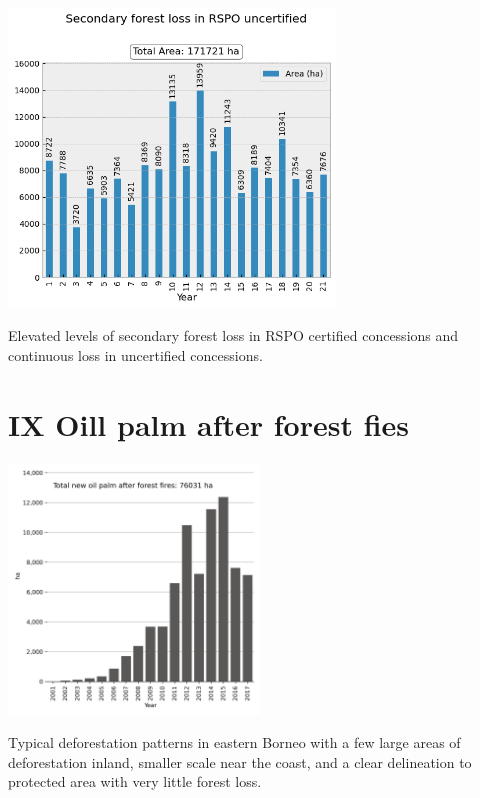 \documentclass[
  letterpaper,
  DIV=11,
  numbers=noendperiod]{scrreprt}
\begin{document}
\includegraphics[width=0.65\textwidth,height=\textheight]{text/../code/results/plots/RSPO_secondary_forest_loss_uncertified.png}

\normalcolor

Elevated levels of secondary forest loss in RSPO certified concessions
and continuous loss in uncertified concessions.

\newpage

\hypertarget{oill-palm-after-forest-fies}{%
\section*{\texorpdfstring{\textsc{IX} Oill palm after forest
fies}{ Oill palm after forest fies}}\label{oill-palm-after-forest-fies}}


\color{white}

\includegraphics[width=0.5\textwidth,height=\textheight]{text/../code/results/final_plots/new_oil_palm_after_forest_fires.png}
\normalcolor

Typical deforestation patterns in eastern Borneo with a few large areas
of deforestation inland, smaller scale near the coast, and a clear
delineation to protected area with very little forest loss.
\end{document}
